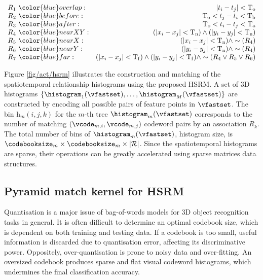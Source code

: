 \begin{equation}
	\centering 
	\begin{array}{lr}
		R_{1}~{\color{blue}overlap}: & |t_i - t_j| < \mathrm{T_{o}} \\
		R_{2}~{\color{blue}before}: & \mathrm{T_{o}} < t_j - t_i < \mathrm{T_{b}} \\
		R_{3}~{\color{blue}after}: & \mathrm{T_{o}} < t_i - t_j < \mathrm{T_{a}} \\
		R_{4}~{\color{blue}nearXY}: & (|x_i - x_j| < \mathrm{T_{n}}) \wedge (|y_i - y_j| < \mathrm{T_{n}}) \\
		R_{5}~{\color{blue}nearX}: & (|x_i - x_j| < \mathrm{T_{n}}) \wedge \sim(R_{4}) \\
		R_{6}~{\color{blue}nearY}: & (|y_i - y_j| < \mathrm{T_{n}}) \wedge \sim(R_{4}) \\
		R_{7}~{\color{blue}far}: & (|x_i - x_j| < \mathrm{T_{f}}) \wedge (|y_i - y_j| < \mathrm{T_{f}}) \wedge \sim(R_{4} \vee R_{5} \vee R_{6})
	\end{array}
\end{equation}

Figure \ref{fig/act/hsrm} illustrates the construction and matching of the spatiotemporal relationship histograms using the proposed HSRM. 
A set of 3D histograms $\{ \histogram_1(\vfastset),\dots,\histogram_{M}(\vfastset)\}$ are constructed by encoding all possible pairs of feature points in $\vfastset$. The bin $\mathrm{h}_{m}(i,j,k)$ for the $m$-th tree $\histogram_{m}(\vfastset)$ corresponds to the number of matching $(\vcode_{m,i},\vcode_{m,j})$ codeword pairs by an association $R_k$. The total number of bins of $\histogram_m(\vfastset)$, \ie histogram size, is $\codebooksize_m \times \codebooksize_m \times |\mathcal{R}|$. Since the spatiotemporal histograms are sparse, their operations can be greatly accelerated using sparse matrices data structures.  

\subsection{Pyramid match kernel for HSRM}
Quantisation is a major issue of bag-of-words models for 3D object recognition tasks in general. It is often difficult to determine an optimal codebook size, which is dependent on both training and testing data. 
If a codebook is too small, useful information is discarded due to quantisation error, affecting its discriminative power. 
Oppositely, over-quantisation is prone to noisy data and over-fitting. An oversized codebook produces sparse and flat visual codeword histograms, which undermines the final classification accuracy.  

